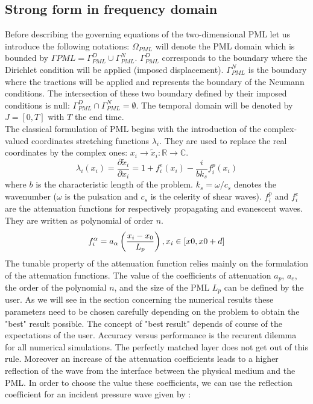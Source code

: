 \subsection{Strong form in frequency domain}
Before describing the governing equations of the two-dimensional PML let us introduce the following notations: $\Omega_{PML}$ will denote the PML domain which is bounded by $\Gamma{PML} = \Gamma_{PML}^D \cup \Gamma_{PML}^N$. $\Gamma_{PML}^D$ corresponds to the boundary where the Dirichlet condition will be applied (imposed displacement). $\Gamma_{PML}^N$ is the boundary where the tractions will be applied and represents the boundary of the Neumann conditions. The intersection of these two boundary defined by their imposed conditions is null: $\Gamma_{PML}^D \cap \Gamma_{PML}^N = \emptyset$. The temporal domain will be denoted by $J = [0,T]$ with $T$ the end time.\\
The classical formulation of PML begins with the introduction of the complex-valued coordinates stretching functions $\lambda_i$. They are used to replace the real coordinates by the complex ones: $x_i \rightarrow \tilde{x}_i: \mathbb{R} \rightarrow \mathbb{C}$.
\begin{equation}
\lambda_i(x_i) = \frac{\partial \tilde{x}_i}{\partial x_i} = 1+f^e_i(x_i)-\frac{i}{b k_s} f^p_i(x_i)
\label{eq:complex-stret-2D}
\end{equation} 
where $b$ is the characteristic length of the problem. $k_s=\omega / c_s$ denotes the wavenumber ($\omega$ is the pulsation and $c_s$ is the celerity of shear waves). $f^p_i$ and $f^e_i$ are the attenuation functions for respectively propagating and evanescent waves. They are written as polynomial of order $n$. 
\begin{equation}
f^\alpha_i = a_\alpha \left(\frac{x_i - x_0}{L_p}  \right), x_i \in [x0,x0+d] \\
\label{eq:attenuation-functions}
\end{equation}
The tunable property of the attenuation function relies mainly on the formulation of the attenuation functions. The value of the coefficients of attenuation $a_p$, $a_e$, the order of the polynomial $n$, and the size of the PML $L_p$ can be defined by the user. As we will see in the section concerning the numerical results these parameters need to be chosen carefully depending on the problem to obtain the "best" result possible. The concept of "best result" depends of course of the expectations of the user. Accuracy versus performance is the recurent dilemma for all numerical simulations. The perfectly matched layer does not get out of this rule. Moreover an increase of the attenuation coefficients leads to a higher reflection of the wave from the interface between the physical medium and the PML. In order to choose the value these coefficients, we can use the reflection coefficient for an incident pressure wave given by \cite{Basu2004}:
